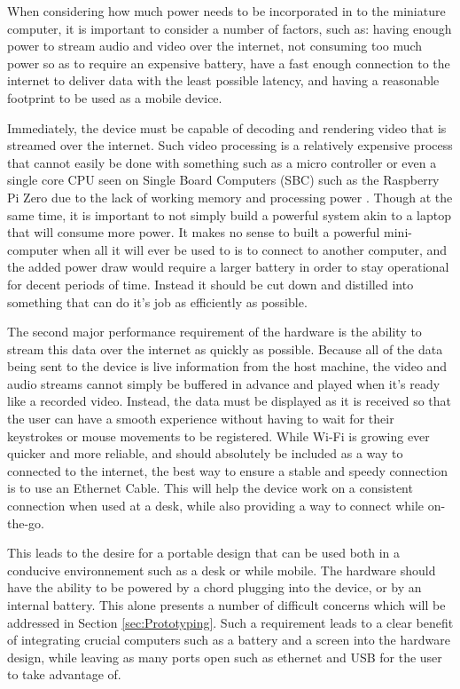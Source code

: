 When considering how much power needs to be incorporated in to the miniature computer, it is important to consider a number of factors, such as: having enough power to stream audio and video over the internet, not consuming too much power so as to require an expensive battery, have a fast enough connection to the internet to deliver data with the least possible latency, and having a reasonable footprint to be used as a mobile device.

Immediately, the device must be capable of decoding and rendering video that is streamed over the internet.
Such video processing is a relatively expensive process that cannot easily be done with something such as a micro controller or even a single core CPU seen on Single Board Computers (SBC) such as the Raspberry Pi Zero due to the lack of working memory and processing power \cite{picockpit_2021}.
Though at the same time, it is important to not simply build a powerful system akin to a laptop that will consume more power.
It makes no sense to built a powerful mini-computer when all it will ever be used to is to connect to another computer, and the added power draw would require a larger battery in order to stay operational for decent periods of time.
Instead it should be cut down and distilled into something that can do it's job as efficiently as possible.

The second major performance requirement of the hardware is the ability to stream this data over the internet as quickly as possible.
Because all of the data being sent to the device is live information from the host machine, the video and audio streams cannot simply be buffered in advance and played when it's ready like a recorded video.
Instead, the data must be displayed as it is received so that the user can have a smooth experience without having to wait for their keystrokes or mouse movements to be registered.
While Wi-Fi is growing ever quicker and more reliable, and should absolutely be included as a way to connected to the internet, the best way to ensure a stable and speedy connection is to use an Ethernet Cable.
This will help the device work on a consistent connection when used at a desk, while also providing a way to connect while on-the-go.

This leads to the desire for a portable design that can be used both in a conducive environnement such as a desk or while mobile.
The hardware should have the ability to be powered by a chord plugging into the device, or by an internal battery.
This alone presents a number of difficult concerns which will be addressed in Section \ref{sec:Prototyping}.
Such a requirement leads to a clear benefit of integrating crucial computers such as a battery and a screen into the hardware design, while leaving as many ports open such as ethernet and USB for the user to take advantage of.


